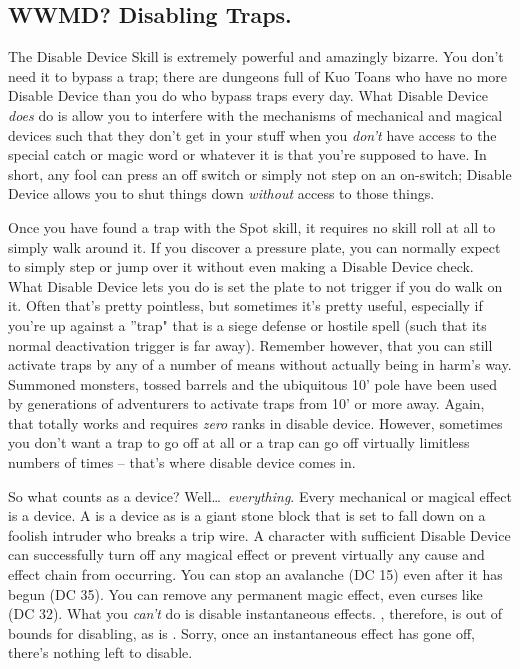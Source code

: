 \subsection{WWMD? Disabling Traps.}
\vspace*{-8pt}

The Disable Device Skill is extremely powerful and amazingly bizarre. You don't need it to bypass a trap; there are dungeons full of Kuo Toans who have no more Disable Device than you do who bypass traps every day. What Disable Device \textit{does} do is allow you to interfere with the mechanisms of mechanical and magical devices such that they don't get in your stuff when you \textit{don't} have access to the special catch or magic word or whatever it is that you're supposed to have. In short, any fool can press an off switch or simply not step on an on-switch; Disable Device allows you to shut things down \textit{without} access to those things.

Once you have found a trap with the Spot skill, it requires no skill roll at all to simply walk around it. If you discover a pressure plate, you can normally expect to simply step or jump over it without even making a Disable Device check. What Disable Device lets you do is set the plate to not trigger if you do walk on it. Often that's pretty pointless, but sometimes it's pretty useful, especially if you're up against a ''trap" that is a siege defense or hostile spell (such that its normal deactivation trigger is far away). Remember however, that you can still activate traps by any of a number of means without actually being in harm's way. Summoned monsters, tossed barrels and the ubiquitous 10' pole have been used by generations of adventurers to activate traps from 10' or more away. Again, that totally works and requires \textit{zero} ranks in disable device. However, sometimes you don't want a trap to go off at all or a trap can go off virtually limitless numbers of times -- that's where disable device comes in.

So what counts as a device? Well\ldots\ \textit{everything}. Every mechanical or magical effect is a device. A  is a device as is a giant stone block that is set to fall down on a foolish intruder who breaks a trip wire. A character with sufficient Disable Device can successfully turn off any magical effect or prevent virtually any cause and effect chain from occurring. You can stop an avalanche (DC 15) even after it has begun (DC 35). You can remove any permanent magic effect, even curses like  (DC 32). What you \textit{can't} do is disable instantaneous effects. , therefore, is out of bounds for disabling, as is . Sorry, once an instantaneous effect has gone off, there's nothing left to disable.

